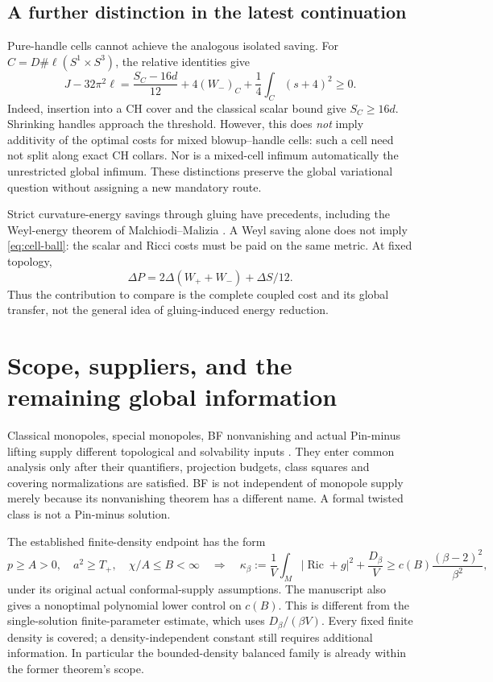 \documentclass[11pt]{article}
\theoremstyle{remark}
\newcommand{\Ric}{\operatorname{Ric}}
\newcommand{\avint}{\frac{1}{V}\int_M}
\begin{document}
\subsection*{A further distinction in the latest continuation}
Pure-handle cells cannot achieve the analogous isolated saving. For
$C=D\#\ell(S^1\times S^3)$, the relative identities give
\begin{equation}
 J-32\pi^2\ell=
 \frac{S_C-16d}{12}+4(W_-)_C+\frac14\int_C(s+4)^2\ge0.
\end{equation}
Indeed, insertion into a CH cover and the classical scalar bound give
$S_C\ge16d$. Shrinking handles approach the threshold. However,
this does \emph{not} imply additivity of the optimal costs for mixed
blowup--handle cells: such a cell need not split along exact CH collars.
Nor is a mixed-cell infimum automatically the unrestricted global
infimum. These distinctions preserve the global variational question
without assigning a new mandatory route.

Strict curvature-energy savings through gluing have precedents, including
the Weyl-energy theorem of Malchiodi--Malizia \cite{MalchiodiMalizia}.
A Weyl saving alone does not imply \eqref{eq:cell-ball}: the scalar and
Ricci costs must be paid on the same metric. At fixed topology,
\[
 \Delta P=2\Delta(W_++W_-)+\Delta S/12.
\]
Thus the contribution to compare is the complete coupled cost and its
global transfer, not the general idea of gluing-induced energy reduction.

\section{Scope, suppliers, and the remaining global information}

Classical monopoles, special monopoles, BF nonvanishing and actual
Pin-minus lifting supply different topological and solvability inputs
\cite{Kotschick,IshidaLeBrun,Pin}. They enter common analysis only after
their quantifiers, projection budgets, class squares and covering
normalizations are satisfied. BF is not independent of monopole supply
merely because its nonvanishing theorem has a different name. A formal
twisted class is not a Pin-minus solution.

The established finite-density endpoint has the form
\begin{equation}
 p\ge A>0,\quad a^2\ge T_+,\quad\chi/A\le B<\infty
 \quad\Longrightarrow\quad
 \kappa_\beta:=\avint|\Ric+g|^2+\frac{D_\beta}{V}
 \ge c(B)\frac{(\beta-2)^2}{\beta^2},
\end{equation}
under its original actual conformal-supply assumptions. The manuscript
also gives a nonoptimal polynomial lower control on $c(B)$.
This is different from the single-solution finite-parameter estimate,
which uses $D_\beta/(\beta V)$. Every fixed finite density is covered;
a density-independent constant still requires additional information.
In particular the bounded-density balanced family is already within
the former theorem's scope.
\end{document}
